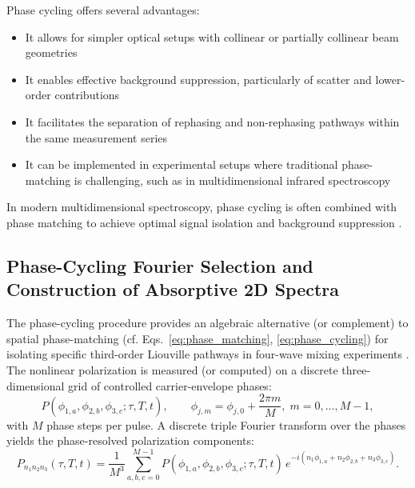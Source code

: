 \noindent Phase cycling offers several advantages:

\begin{itemize}
    \item It allows for simpler optical setups with collinear or partially collinear beam geometries
    \item It enables effective background suppression, particularly of scatter and lower-order contributions
    \item It facilitates the separation of rephasing and non-rephasing pathways within the same measurement series
    \item It can be implemented in experimental setups where traditional phase-matching is challenging, such as in multidimensional infrared spectroscopy
\end{itemize}

\noindent In modern multidimensional spectroscopy, phase cycling is often combined with phase matching to achieve optimal signal isolation and background suppression \cite{Huang-FuEtAl2024DevelopmentPhasecyclingInterfacespecific, TianEtAl2003FemtosecondPhasecoherentTwodimensional}.

\subsection{Phase-Cycling Fourier Selection and Construction of Absorptive 2D Spectra}
\label{subsec:phase_cycling_fourier_selection}

\noindent The phase-cycling procedure provides an algebraic alternative (or complement) to spatial phase-matching (cf. Eqs.~\eqref{eq:phase_matching}, \eqref{eq:phase_cycling}) for isolating specific third-order Liouville pathways in four-wave mixing experiments \cite{Mukamel1995PrinciplesNonlinearOptical, Cho2009TwodimensionalOpticalSpectroscopy, Jonas2003TwodimensionalFemtosecondSpectroscopy, BrixnerEtAl2004PhasestabilizedTwodimensionalElectronic, GreenEtAl2024}. The nonlinear polarization is measured (or computed) on a discrete three-dimensional grid of controlled carrier-envelope phases:
\begin{equation}
    P(\phi_{1,a}, \phi_{2,b}, \phi_{3,c}; \tau, T, t), \qquad 
    \phi_{j,m} = \phi_{j,0} + \frac{2\pi m}{M}, \; m=0,\dots,M-1,
    \label{eq:phase_grid_definition}
\end{equation}
with $M$ phase steps per pulse. A discrete triple Fourier transform over the phases yields the phase-resolved polarization components:
\begin{equation}
    P_{n_1 n_2 n_3}(\tau, T, t)
    =
    \frac{1}{M^{3}}
    \sum_{a,b,c=0}^{M-1}
    P(\phi_{1,a}, \phi_{2,b}, \phi_{3,c}; \tau, T, t)\,
    e^{-i ( n_1 \phi_{1,a} + n_2 \phi_{2,b} + n_3 \phi_{3,c} )}.
    \label{eq:dft_phase_cycling}
\end{equation}

